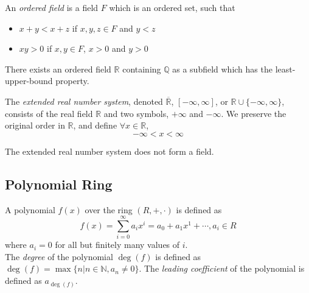 \documentclass{report}
\begin{document}
		\begin{defn} \label{def_ordered_field}
			An \emph{ordered field} is a field $F$ which is an ordered set, such that
			\begin{itemize}
				\item $x+y<x+z$ if $x,y,z \in F$ and $y<z$
				\item $xy>0$ if $x,y \in F$, $x>0$ and $y>0$
			\end{itemize}
			\end{defn}

		\begin{thm} \label{thm_existence_real_number}
			There exists an ordered field $\mathbb{R}$ containing $\mathbb{Q}$ as a subfield which has the least-upper-bound property.
		\end{thm}

		\begin{defn} \label{def_extended_real_number_system}
			The \emph{extended real number system}, denoted $\overline{\mathbb{R}}$, $[-\infty,\infty]$, or $\mathbb{R} \cup \{-\infty,\infty\}$, consists of the real field $\mathbb{R}$ and two symbols, $+\infty$ and $-\infty$. We preserve the original order in $\mathbb{R}$, and define $\forall x \in \mathbb{R}$,
			\begin{displaymath}
				-\infty<x<\infty
			\end{displaymath}
		\end{defn}

		\begin{remark} \label{remark_extended_real_number_system_not_field}
			The extended real number system does not form a field.
		\end{remark}
	
		\subsection{Polynomial Ring}
		\begin{defn} \label{def_polynomial}
			A polynomial $f(x)$ over the ring $(R,+,\cdot)$ is defined as
			\begin{displaymath}
				f(x)=\sum_{i=0}^{\infty}a_ix^i=a_0+a_1x^1+\cdots,a_i\in R
			\end{displaymath}
			where $a_i=0$ for all but finitely many values of $i$.\\
			The \emph{degree} of the polynomial $\deg(f)$ is defined as $\deg(f)=\max\{n|n\in\mathbb{N}, a_n\ne0 \}$.
			The \emph{leading coefficient} of the polynomial is defined as $a_{\deg(f)}$.
		\end{defn}
\end{document}
